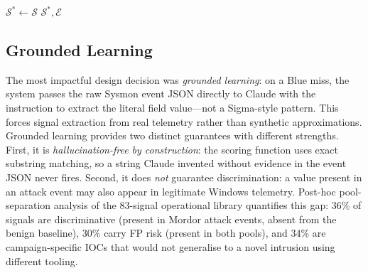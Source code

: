 \documentclass[sigconf, nonacm]{acmart}
\begin{document}
\begin{algorithm}[ht]
\DontPrintSemicolon
\SetAlgoLined
{}
\BlankLine
{}
$\mathcal{S}^* \leftarrow \mathcal{S}$\;
\Return $\mathcal{S}^*, \mathcal{E}$\;
\caption{find-evil Red–Blue adversarial loop}
\label{alg:loop}
\end{algorithm}

\subsection{Grounded Learning}

The most impactful design decision was \emph{grounded learning}: on a
Blue miss, the system passes the raw Sysmon event JSON directly to Claude
with the instruction to extract the literal field value---not a Sigma-style
pattern. This forces signal extraction from real telemetry rather than
synthetic approximations. Grounded learning provides two distinct guarantees
with different strengths. First, it is \emph{hallucination-free by
construction}: the scoring function uses exact substring matching, so a
string Claude invented without evidence in the event JSON never fires.
Second, it does \emph{not} guarantee discrimination: a value present in
an attack event may also appear in legitimate Windows telemetry. Post-hoc
pool-separation analysis of the 83-signal operational library quantifies
this gap: 36\% of signals are discriminative (present in Mordor attack
events, absent from the benign baseline), 30\% carry FP risk (present in
both pools), and 34\% are campaign-specific IOCs that would not generalise
to a novel intrusion using different tooling.
\end{document}
